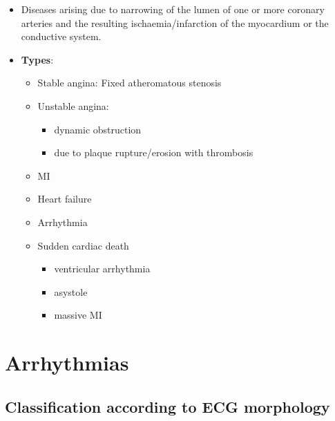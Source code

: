 \documentclass[
  12pt,
]{memoir}
\providecommand{\tightlist}{%
  \setlength{\itemsep}{0pt}\setlength{\parskip}{0pt}}
\begin{document}
\begin{itemize}
\tightlist
\item
  Diseases arising due to narrowing of the lumen of one or more coronary
  arteries and the resulting ischaemia/infarction of the myocardium or
  the conductive system.
\item
  \textbf{Types}:

  \begin{itemize}
  \tightlist
  \item
    Stable angina: Fixed atheromatous stenosis
  \item
    Unstable angina:

    \begin{itemize}
    \tightlist
    \item
      dynamic obstruction
    \item
      due to plaque rupture/erosion with thrombosis
    \end{itemize}
  \item
    MI
  \item
    Heart failure
  \item
    Arrhythmia
  \item
    Sudden cardiac death

    \begin{itemize}
    \tightlist
    \item
      ventricular arrhythmia
    \item
      asystole
    \item
      massive MI
    \end{itemize}
  \end{itemize}
\end{itemize}

\hypertarget{arrhythmias}{%
\section{Arrhythmias}\label{arrhythmias}}

\hypertarget{classification-according-to-ecg-morphology}{%
\subsection{Classification according to ECG
morphology}\label{classification-according-to-ecg-morphology}}
\end{document}
